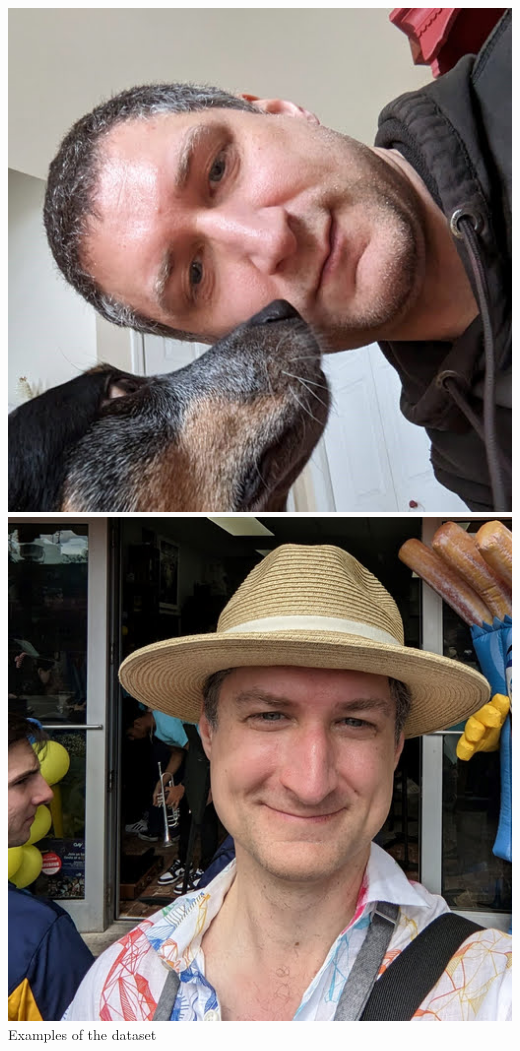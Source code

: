 \documentclass{article}
\begin{document}
\begin{center}
    \includegraphics[scale=0.125]{.imgs/dataset/00007-0-PXL_20230204_202340837.MP.jpg}
    \includegraphics[scale=0.125]{.imgs/dataset/00008-0-PXL_20230218_175154938.MP.jpg} \\
    Examples of the dataset
\end{center}
\end{document}
